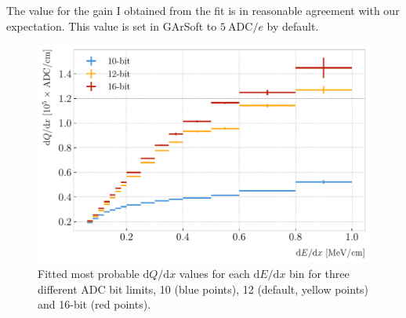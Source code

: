 The value for the gain I obtained from the fit is in reasonable agreement with our expectation. This value is set in GArSoft to $5 \ \mathrm{ADC}/e$ by default.

\begin{figure}[t]
	\centering
	\includegraphics[width=.85\linewidth]{Images/GArSoft_PID/dEdx/dEdx_vs_dQdx_ADC_saturation_mpv.pdf}
	\caption{Fitted most probable $\mathrm{d}Q/\mathrm{d}x$ values for each $\mathrm{d}E/\mathrm{d}x$ bin for three different ADC bit limits, 10 (blue points), 12 (default, yellow points) and 16-bit (red points).}
	\label{fig:energy_adc_saturation}
\end{figure}

